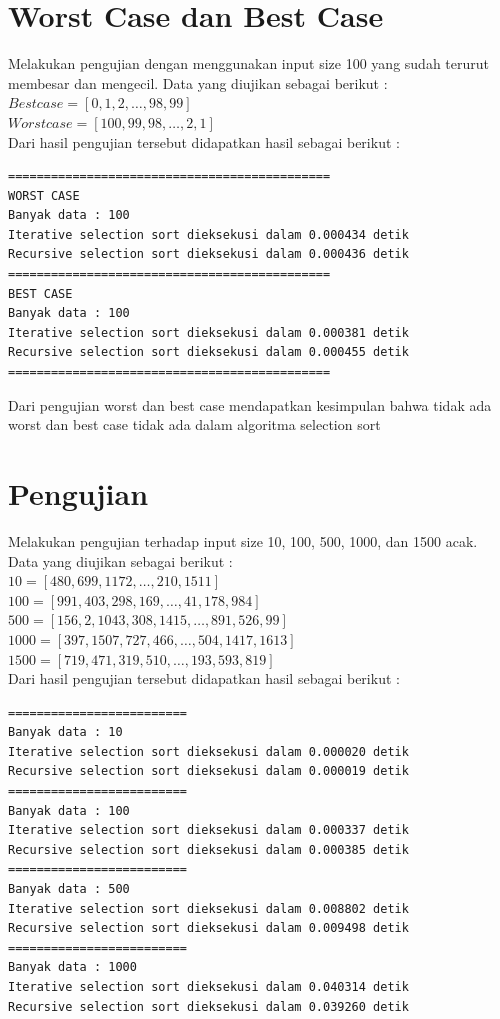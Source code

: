 \documentclass[12pt]{article}
\begin{document}
\section{Worst Case dan Best Case}
Melakukan pengujian dengan menggunakan input size 100 yang sudah terurut membesar dan mengecil.
Data yang diujikan sebagai berikut :\\
$Best case = [0, 1, 2,\dotsc,98, 99]$\\
$Worst case = [100, 99, 98,\dotsc,2, 1]$\\
Dari hasil pengujian tersebut didapatkan hasil sebagai berikut :
\begin{verbatim}
=============================================
WORST CASE
Banyak data : 100
Iterative selection sort dieksekusi dalam 0.000434 detik
Recursive selection sort dieksekusi dalam 0.000436 detik
=============================================
BEST CASE
Banyak data : 100
Iterative selection sort dieksekusi dalam 0.000381 detik
Recursive selection sort dieksekusi dalam 0.000455 detik
=============================================
\end{verbatim}
Dari pengujian worst dan best case mendapatkan kesimpulan bahwa tidak ada worst dan best case tidak ada dalam algoritma selection sort
\newpage
\section{Pengujian}
Melakukan pengujian terhadap input size 10, 100, 500, 1000, dan 1500 acak.\\
Data yang diujikan sebagai berikut :\\
$10 = [480, 699, 1172,\dotsc,210, 1511]$\\
$100 = [991, 403, 298, 169,\dotsc,41, 178, 984]$\\
$500 = [156, 2, 1043, 308, 1415,\dotsc, 891, 526, 99]$\\
$1000 = [397, 1507, 727, 466,\dotsc, 504, 1417, 1613]$\\
$1500 = [719, 471, 319, 510,\dotsc,  193, 593, 819]$\\
Dari hasil pengujian tersebut didapatkan hasil sebagai berikut :
\begin{verbatim}
=========================
Banyak data : 10
Iterative selection sort dieksekusi dalam 0.000020 detik
Recursive selection sort dieksekusi dalam 0.000019 detik
=========================
Banyak data : 100
Iterative selection sort dieksekusi dalam 0.000337 detik
Recursive selection sort dieksekusi dalam 0.000385 detik
=========================
Banyak data : 500
Iterative selection sort dieksekusi dalam 0.008802 detik
Recursive selection sort dieksekusi dalam 0.009498 detik
=========================
Banyak data : 1000
Iterative selection sort dieksekusi dalam 0.040314 detik
Recursive selection sort dieksekusi dalam 0.039260 detik
\end{verbatim}
\end{document}
